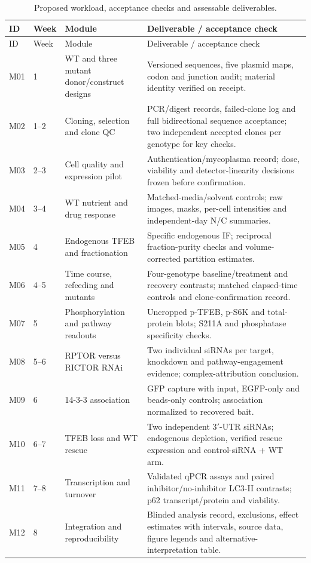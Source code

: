 \small
\begin{longtable}{L{0.08\textwidth}L{0.10\textwidth}L{0.33\textwidth}L{0.40\textwidth}}
\caption{Proposed workload, acceptance checks and assessable deliverables.}\label{tab:workplan}\\
\toprule ID & Week & Module & Deliverable / acceptance check \\
\midrule\endfirsthead
\toprule ID & Week & Module & Deliverable / acceptance check \\
\midrule\endhead
\bottomrule\endfoot
M01 & 1 & WT and three mutant donor/construct designs & Versioned sequences, five plasmid maps, codon and junction audit; material identity verified on receipt. \\
M02 & 1--2 & Cloning, selection and clone QC & PCR/digest records, failed-clone log and full bidirectional sequence acceptance; two independent accepted clones per genotype for key checks. \\
M03 & 2--3 & Cell quality and expression pilot & Authentication/mycoplasma record; dose, viability and detector-linearity decisions frozen before confirmation. \\
M04 & 3--4 & WT nutrient and drug response & Matched-media/solvent controls; raw images, masks, per-cell intensities and independent-day N/C summaries. \\
M05 & 4 & Endogenous TFEB and fractionation & Specific endogenous IF; reciprocal fraction-purity checks and volume-corrected partition estimates. \\
M06 & 4--5 & Time course, refeeding and mutants & Four-genotype baseline/treatment and recovery contrasts; matched elapsed-time controls and clone-confirmation record. \\
M07 & 5 & Phosphorylation and pathway readouts & Uncropped p-TFEB, p-S6K and total-protein blots; S211A and phosphatase specificity checks. \\
M08 & 5--6 & RPTOR versus RICTOR RNAi & Two individual siRNAs per target, knockdown and pathway-engagement evidence; complex-attribution conclusion. \\
M09 & 6 & 14-3-3 association & GFP capture with input, EGFP-only and beads-only controls; association normalized to recovered bait. \\
M10 & 6--7 & TFEB loss and WT rescue & Two independent 3$'$-UTR siRNAs; endogenous depletion, verified rescue expression and control-siRNA + WT arm. \\
M11 & 7--8 & Transcription and turnover & Validated qPCR assays and paired inhibitor/no-inhibitor LC3-II contrasts; p62 transcript/protein and viability. \\
M12 & 8 & Integration and reproducibility & Blinded analysis record, exclusions, effect estimates with intervals, source data, figure legends and alternative-interpretation table. \\
\end{longtable}
\normalsize

